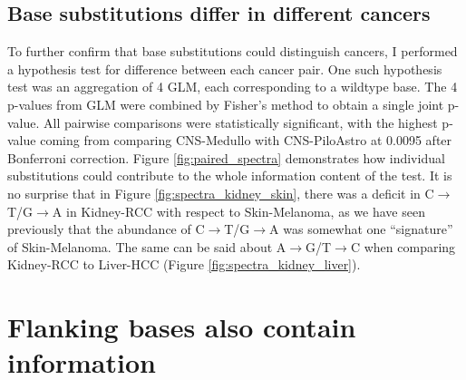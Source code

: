 

\subsection{Base substitutions differ in different cancers}
To further confirm that base substitutions could distinguish cancers, I performed a hypothesis test for difference between each cancer pair. One such hypothesis test was an aggregation of 4 GLM, each corresponding to a wildtype base. The 4 p-values from GLM were combined by Fisher's method to obtain a single joint p-value. All pairwise comparisons were statistically significant, with the highest p-value coming from comparing CNS-Medullo with CNS-PiloAstro at 0.0095 after Bonferroni correction. Figure \ref{fig:paired_spectra} demonstrates how individual substitutions could contribute to the whole information content of the test. It is no surprise that in Figure \ref{fig:spectra_kidney_skin}, there was a deficit in C$\rightarrow$T/G$\rightarrow$A in Kidney-RCC with respect to Skin-Melanoma, as we have seen previously that the abundance of C$\rightarrow$T/G$\rightarrow$A was somewhat one ``signature'' of Skin-Melanoma. The same can be said about A$\rightarrow$G/T$\rightarrow$C when comparing Kidney-RCC to Liver-HCC (Figure \ref{fig:spectra_kidney_liver}).



\section{Flanking bases also contain information}

